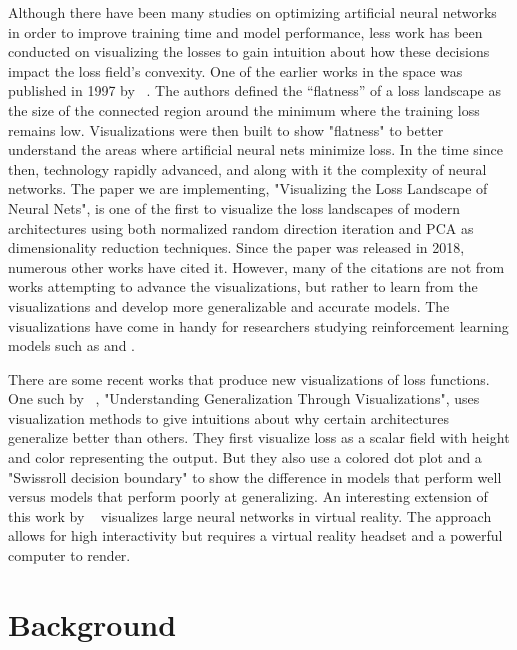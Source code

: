 \documentclass{acmsiggraph}
\begin{document}
Although there have been many studies on optimizing artificial neural networks in order to improve training time and model performance, less work has been conducted on visualizing the losses to gain intuition about how these decisions impact the loss field's convexity. One of the earlier works in the space was published in 1997 by ~\cite{hochreiter1997flat}. The authors defined the “flatness” of a loss landscape as the size of the connected region around the minimum where the training loss remains low. Visualizations were then built to show "flatness" to better understand the areas where artificial neural nets minimize loss. In the time since then, technology rapidly advanced, and along with it the complexity of neural networks. The paper we are implementing, "Visualizing the Loss Landscape of Neural Nets", is one of the first to visualize the loss landscapes of modern architectures using both normalized random direction iteration and PCA as dimensionality reduction techniques. Since the paper was released in 2018, numerous other works have cited it. However, many of the citations are not from works attempting to advance the visualizations, but rather to learn from the visualizations and develop more generalizable and accurate models.
The visualizations have come in handy for researchers studying reinforcement learning models such as \cite{actor2020} and \cite{plaat2022deep}.

There are some recent works that produce new visualizations of loss functions. One such by ~\cite{pmlr-v137-huang20a}, "Understanding Generalization Through Visualizations", uses visualization methods to give intuitions about why certain architectures generalize better than others. They first visualize loss as a scalar field with height and color representing the output. But they also use a colored dot plot and a "Swissroll decision boundary" to show the difference in models that perform well versus models that perform poorly at generalizing. An interesting extension of this work by ~\cite{linse2022walk} visualizes large neural networks in virtual reality. The approach allows for high interactivity but requires a virtual reality headset and a powerful computer to render.

\section{Background}
\label{sec:intro}
\end{document}
